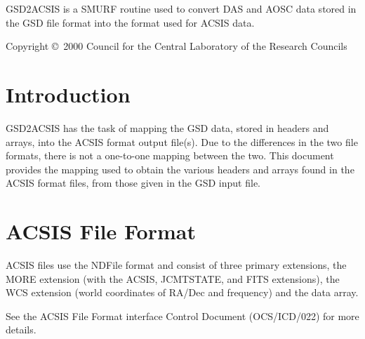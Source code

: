 \documentclass[twoside,11pt]{article}
\newcommand{\stardocinitials}  {SUN}
\newcommand{\stardoccopyright} 
{Copyright \copyright\ 2000 Council for the Central Laboratory of the Research Councils}
\newcommand{\stardocnumber}    {259.1}
\newcommand{\stardocabstract}  {
GSD2ACSIS is a SMURF routine used to convert DAS and AOSC data stored in the GSD file format into the format used for ACSIS data.
}
\newcommand{\stardocname}{\stardocinitials /\stardocnumber}
\newcommand{\htmladdnormallink}[2]{#1}
\newenvironment{latexonly}{}{}
\newcommand{\xref}[3]{#1}
\newcommand{\xlabel}[1]{}
\renewcommand{\_}{\texttt{\symbol{95}}}
\renewcommand{\thepage}{\roman{page}}
\begin{document}
\stardocabstract

\begin{latexonly}
\newpage
\vspace*{\fill}
\stardoccopyright
\end{latexonly}

  \newpage
  \begin{latexonly}
    \setlength{\parskip}{0mm}
    \tableofcontents
    \setlength{\parskip}{\medskipamount}
    \markboth{\stardocname}{\stardocname}
  \end{latexonly}

\cleardoublepage
\renewcommand{\thepage}{\arabic{page}}
\setcounter{page}{1}


\section{\xlabel{introduction}Introduction}
GSD2ACSIS has the task of mapping the GSD data, stored in headers and arrays, into the ACSIS format output file(s).  Due to the differences in the two file formats, there is not a one-to-one mapping between the two.  This document provides the mapping used to obtain the various headers and arrays found in the ACSIS format files, from those given in the GSD input file.

\section{\xlabel{ACSIS_file_format}ACSIS File Format}
ACSIS files use the \xref{NDF}{sun33} file format and consist of three primary extensions, the MORE extension (with the ACSIS, JCMTSTATE, and FITS extensions), the WCS extension (world coordinates of RA/Dec and frequency) and the data array.

See the ACSIS File Format interface Control Document (\htmladdnormallink{OCS/ICD/022}{http://docs.jach.hawaii.edu/JCMT/OCS/ICD/022/ocs_icd_022.pdf}) for more details.
\end{document}
